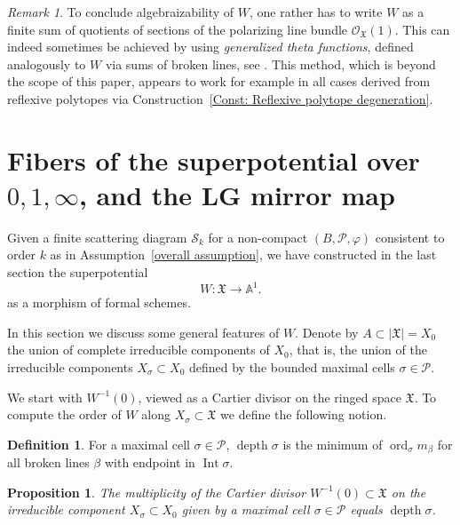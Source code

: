\documentclass[11pt,letter]{amsart}
\newtheorem{proposition}[theorem]{Proposition}
\theoremstyle{definition}
\newtheorem{definition}[theorem]{Definition}
\theoremstyle{remark}
\newtheorem{remark}[theorem]{Remark}
\numberwithin{equation}{section}
\numberwithin{figure}{section}
\renewcommand{\AA} {\mathbb{A}}
\newcommand {\depth} {\operatorname{depth}}
\newcommand {\Int}  {\operatorname{Int}}
\newcommand {\lra}  {\longrightarrow}
\renewcommand{\O}  {\mathcal{O}}
\newcommand {\ord}  {\operatorname{ord}}
\renewcommand{\P}  {\mathscr{P}}
\newcommand {\scrS}  {\mathscr{S}}
\newcommand {\X} {\mathfrak X}
\begin{document}
\begin{remark}
To conclude algebraizability of $W$, one rather has to write $W$ as a finite sum
of quotients of sections of the polarizing line bundle $\O_\X(1)$. This can
indeed sometimes be achieved by using \emph{generalized theta functions},
defined analogously to $W$ via sums of broken lines, see
\cite{thetasurvey,Theta}. This method, which is beyond the scope of this paper,
appears to work for example in all cases derived from reflexive polytopes via
Construction~\ref{Const: Reflexive polytope degeneration}.
\end{remark}




\section{Fibers of the superpotential over $0,1,\infty$, and the LG mirror map}
\label{sect: special fiber}

Given a finite scattering diagram $\scrS_k$ for a non-compact $(B,\P,\varphi)$
consistent to order $k$ as in Assumption~\ref{overall assumption}, we have
constructed in the last section the superpotential
\begin{equation}
W:\X\lra \AA^1.
\end{equation}
as a morphism of formal schemes.

In this section we discuss some general features of $W$. Denote by
$A\subset|\X|=X_0$ the union of complete irreducible components of $X_0$,
that is, the union of the irreducible components $X_\sigma\subset X_0$ defined
by the bounded maximal cells $\sigma\in\P$.

We start with $W^{-1}(0)$, viewed as a Cartier divisor on the ringed
space $\X$. To compute the order of $W$ along $X_\sigma\subset\X$ we define the following notion.

\begin{definition}
For a maximal cell $\sigma\in\P$, $\depth\sigma$ is the minimum
of $\ord_\sigma m_\beta$ for all broken lines $\beta$ with endpoint in $\Int\sigma$.
\end{definition}

\begin{proposition}
\label{Prop: 0-fiber of W}
The multiplicity of the Cartier divisor $W^{-1}(0)\subset \X$ on the irreducible
component $X_\sigma\subset X_0$ given by a maximal cell $\sigma\in\P$ equals
$\depth\sigma$.
\end{proposition}
\end{document}
